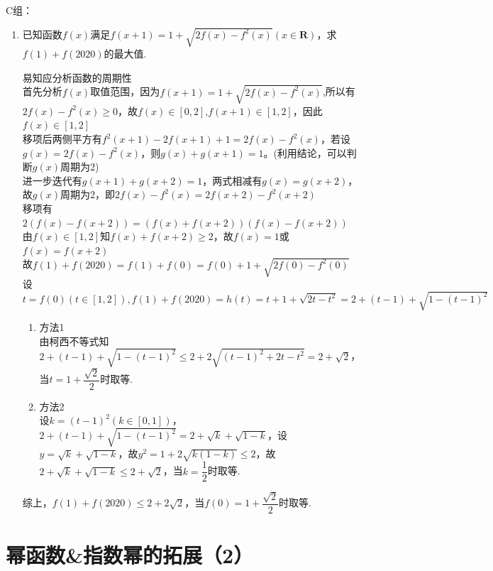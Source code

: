 C组：
\begin{enumerate}
    \item 已知函数$f(x)$满足$f(x+1) = 1+\sqrt{2f(x)-f^2(x)}(x \in \mathbf{R})$，求$f(1) + f(2020)$的最大值.
    \begin{jieda}
        易知应分析函数的周期性 \\
        首先分析$f(x)$取值范围，因为$f(x+1) = 1+\sqrt{2f(x)-f^2(x)}$,所以有$2f(x)-f^2(x) \geq 0$，故$f(x) \in [0, 2]$,$f(x+1) \in [1, 2]$，因此$f(x) \in [1, 2]$ \\
        移项后两侧平方有$f^2(x+1) - 2f(x+1) + 1 = 2f(x) - f^2(x)$，若设$g(x) = 2f(x) - f^2(x)$，则$g(x) + g(x+1) = 1$。(利用结论，可以判断$g(x)$周期为2) \\
        进一步迭代有$g(x+1) + g(x+2) = 1$，两式相减有$g(x)= g(x+2)$，故$g(x)$周期为2，即$2f(x)-f^2(x) = 2f(x+2)  - f^2(x+2)$ \\
        移项有$2(f(x)-f(x+2))= (f(x) + f(x+2))(f(x)- f(x+2))$ \\
        由$f(x) \in [1, 2]$知$f(x) + f(x+2) \geq 2$，故$f(x) = 1$或$f(x) = f(x+2)$ \\
        故$f(1) + f(2020) = f(1) + f(0) = f(0) + 1 + \sqrt{2f(0)-f^2(0)}$ \\
        设$t = f(0) (t \in [1, 2]), f(1) + f(2020) = h(t) = t + 1 + \sqrt{2t-t^2} = 2 + (t-1) + \sqrt{1-(t-1)^2}$ 
        \begin{enumerate}
            \item 方法1 \\
            由柯西不等式知$2 + (t-1) + \sqrt{1-(t-1)^2}\leq 2 + 2\sqrt{(t-1)^2 + 2t-t^2} = 2+\sqrt{2}$，当$t = 1+\dfrac{\sqrt{2}}{2}$时取等.
            \item 方法2 \\
            设$k = (t-1)^2 (k \in [0, 1])$，$2 + (t-1) + \sqrt{1-(t-1)^2} = 2 + \sqrt{k} + \sqrt{1-k}$，设$y = \sqrt{k} + \sqrt{1-k}$，故$y^2 = 1 + 2\sqrt{k(1-k)} \leq 2$，故$2 + \sqrt{k} + \sqrt{1-k} \leq 2 + \sqrt{2}$，当$k = \dfrac{1}{2}$时取等.
        \end{enumerate}
        综上，$f(1) + f(2020) \leq 2+2\sqrt{2}$，当$f(0) = 1+\dfrac{\sqrt{2}}{2}$时取等.
         
    \end{jieda}
    \begin{vspace_}
    \vsp[3]
    \end{vspace_}
\end{enumerate}



\section{幂函数\&指数幂的拓展（2）}

